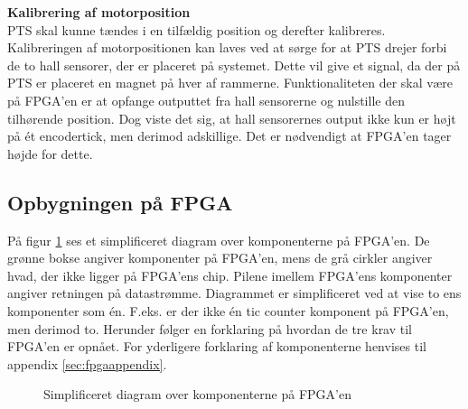 \textbf{Kalibrering af motorposition}\\
PTS skal kunne tændes i en tilfældig position og derefter kalibreres.
Kalibreringen af motorpositionen kan laves ved at sørge for at PTS drejer forbi 
de to hall sensorer, der er placeret på systemet. Dette vil give et signal, da 
der på PTS er placeret en magnet på hver af rammerne.
Funktionaliteten der skal være på FPGA'en er at opfange outputtet fra 
hall sensorerne og nulstille den tilhørende position.
Dog viste det sig, at hall sensorernes output ikke kun er højt på ét encodertick, 
men derimod adskillige. Det er nødvendigt at FPGA'en tager højde for 
dette.

\subsection{Opbygningen på FPGA}
På figur \ref{fig:FPGA_blok} ses et simplificeret diagram over komponenterne på FPGA'en. 
De grønne bokse angiver komponenter på FPGA'en, mens de grå cirkler angiver hvad, der ikke ligger på 
FPGA'ens chip. Pilene imellem FPGA'ens komponenter angiver retningen på 
datastrømme. Diagrammet er simplificeret ved at vise to ens komponenter som én. 
F.eks. er der ikke én tic counter komponent på FPGA'en, men derimod to.
Herunder følger en forklaring på hvordan de tre krav til FPGA'en er opnået. For 
yderligere forklaring af komponenterne henvises til appendix 
\ref{sec:fpgaappendix}.



\begin{figure}[!th]
\centering
\begin{tikzpicture}[node distance = 5 cm,scale=1]

\end{tikzpicture}
\caption[Diagram over FPGA komponenter]{Simplificeret diagram over komponenterne på FPGA'en}
\label{fig:FPGA_blok}
\end{figure}


